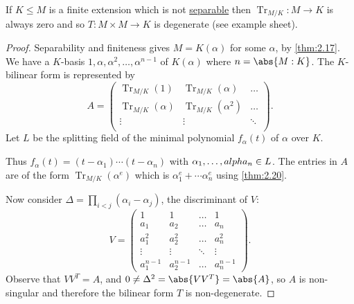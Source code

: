 \documentclass{article}
\DeclareMathOperator{\Tr}{Tr}
\begin{document}
\begin{remark}
    If $K \leq M$ is a finite extension which is not \hyperlink{def:separableExt}{separable} then $\Tr_{M/K}: M \to K$ is always zero and so $T:M\times M \to K$ is degenerate (see example sheet).
\end{remark}

\begin{proof}
    Separability and finiteness gives $M=K(\alpha)$ for some $\alpha$, by \cref{thm:2.17}.
    We have a $K$-basis $1, \alpha, \alpha^2, \dotsc, \alpha^{n-1}$ of $K(\alpha)$ where $n = \abs{M:K}$.
    The $K$-bilinear form is represented by
    \begin{equation*}
        A =
        \begin{pmatrix}
            \Tr_{M/K}(1)      & \Tr_{M/K}(\alpha)   & \dots  \\
            \Tr_{M/K}(\alpha) & \Tr_{M/K}(\alpha^2) & \dots  \\
            \vdots            & \vdots              & \ddots \\
        \end{pmatrix}.
    \end{equation*}
    Let $L$ be the splitting field of the minimal polynomial $f_\alpha(t)$ of $\alpha$ over $K$.

    Thus $f_\alpha(t) = (t-\alpha_1) \dotsm (t-\alpha_n)$ with $\alpha_1, \dotsc, \\alpha_n \in L$.
    The entries in $A$ are of the form $\Tr_{M/K}(\alpha^e)$ which is $\alpha_1^e + \dotsb \alpha_n^e$ using \cref{thm:2.20}.

    Now consider $\Delta = \prod_{i < j} (\alpha_i - \alpha_j)$, the discriminant of $V$:
    \begin{equation*}
        V =
        \begin{pmatrix}
            1 & 1 & \dots & 1 \\
            a_1 & a_2 & \dots & a_n \\
            a_1^2 & a_2^2 & \dots & a_n^2 \\
            \vdots & \vdots & \ddots & \vdots \\
            a_1^{n-1} & a_2^{n-1} & \dots & a_n^{n-1}
        \end{pmatrix}.
    \end{equation*}
    Observe that $V V^T = A$, and $0 \neq \Delta^2 = \abs{V V^T} = \abs{A}$, so $A$ is non-singular and therefore the bilinear form $T$ is non-degenerate.
\end{proof}
\end{document}
